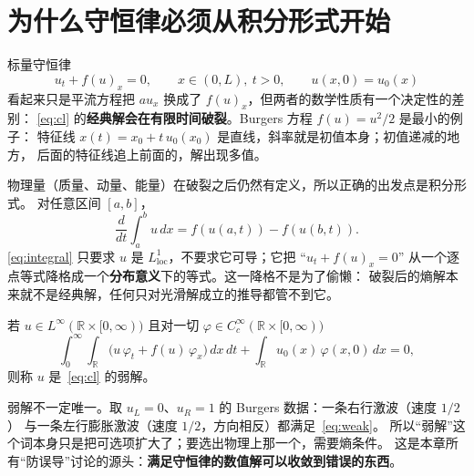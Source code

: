 

\section{为什么守恒律必须从积分形式开始}

标量守恒律
\begin{equation}
  u_t+f(u)_x=0,\qquad x\in(0,L),\ t>0,\qquad u(x,0)=u_0(x)
  \label{eq:cl}
\end{equation}
看起来只是平流方程把 $a u_x$ 换成了 $f(u)_x$，但两者的数学性质有一个决定性的差别：
\eqref{eq:cl} 的\textbf{经典解会在有限时间破裂}。Burgers 方程 $f(u)=u^2/2$ 是最小的例子：
特征线 $x(t)=x_0+t\,u_0(x_0)$ 是直线，斜率就是初值本身；初值递减的地方，
后面的特征线追上前面的，解出现多值。

物理量（质量、动量、能量）在破裂之后仍然有定义，所以正确的出发点是积分形式。
对任意区间 $[a,b]$，
\begin{equation}
  \frac{d}{dt}\int_a^b u\,dx
  = f(u(a,t))-f(u(b,t)).
  \label{eq:integral}
\end{equation}
\eqref{eq:integral} 只要求 $u$ 是 $L^1_{\text{loc}}$，不要求它可导；它把 ``$u_t+f(u)_x=0$''
从一个逐点等式降格成一个\textbf{分布意义}下的等式。这一降格不是为了偷懒：
破裂后的熵解本来就不是经典解，任何只对光滑解成立的推导都管不到它。

\begin{definition}[弱解]
若 $u\in L^\infty(\mathbb{R}\times[0,\infty))$ 且对一切 $\varphi\in C_c^\infty(\mathbb{R}\times[0,\infty))$
\begin{equation}
  \int_0^\infty\!\!\int_{\mathbb{R}}
  \bigl(u\,\varphi_t+f(u)\,\varphi_x\bigr)\,dx\,dt
  +\int_{\mathbb{R}}u_0(x)\,\varphi(x,0)\,dx=0,
  \label{eq:weak}
\end{equation}
则称 $u$ 是~\eqref{eq:cl} 的弱解。
\end{definition}

弱解不一定唯一。取 $u_L=0$、$u_R=1$ 的 Burgers 数据：一条右行激波（速度 $1/2$）
与一条左行膨胀激波（速度 $1/2$，方向相反）都满足~\eqref{eq:weak}。
所以``弱解''这个词本身只是把可选项扩大了；要选出物理上那一个，需要熵条件。
这是本章所有``防误导''讨论的源头：\textbf{满足守恒律的数值解可以收敛到错误的东西}。

